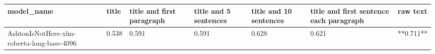 \begin{tabular}{lllllll}
\toprule
                                model\_name & title & title and first paragraph & title and 5 sentences & title and 10 sentences & title and first sentence each paragraph &  raw text \\
\midrule
AshtonIsNotHere-xlm-roberta-long-base-4096 & 0.538 &                     0.591 &                 0.591 &                  0.628 &                                   0.621 & **0.711** \\
\bottomrule
\end{tabular}
